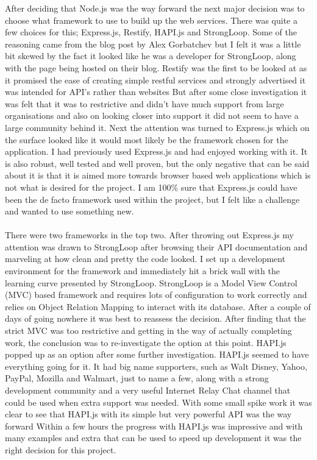 After deciding that Node.js was the way forward the next major decision was to choose what framework to use to build up the web services. There was quite a few choices for this; Express.js, Restify, HAPI.js and StrongLoop. Some of the reasoning came from the blog post by Alex Gorbatchev \cite{AlexGorbatchev:CompairingExpressRestifyHapLoopBack:2015:online} but I felt it was a little bit skewed by the fact it looked like he was a developer for StrongLoop, along with the page being hosted on their blog. Restify was the first to be looked at as it promised the ease of creating simple restful services and strongly advertised it was intended for API's rather than websites But after some close investigation it was felt that it was to restrictive and didn't have much support from large organisations and also on looking closer into support it did not seem to have a large community behind it. Next the attention was turned to Express.js which on the surface looked like it would most likely be the framework chosen for the application. I had previously used Express.js and had enjoyed working with it. It is also robust, well tested and well proven, but the only negative that can be said about it is that it is aimed more towards browser based web applications which is not what is desired for the project. I am 100\% sure that Express.js could have been the de facto framework used within the project, but I felt like a challenge and wanted to use something new.\\
\\
There were two frameworks in the top two. After throwing out Express.js my attention was drawn to StrongLoop after browsing their API documentation and marveling at how clean and pretty the code looked. I set up a development environment for the framework and immediately hit a brick wall with the learning curve presented by StrongLoop. StrongLoop is a Model View Control (MVC) based framework and requires lots of configuration to work correctly and relies on Object Relation Mapping to interact with its database. After a couple of days of going nowhere it was best to reassess the decision. After finding that the strict MVC was too restrictive and getting in the way of actually completing work, the conclusion was to re-investigate the option at this point. HAPI.js popped up as an option after some further investigation. HAPI.js seemed to have everything going for it. It had big name supporters, such as Walt Disney, Yahoo, PayPal, Mozilla and Walmart, just to name a few, along with a strong development community and a very useful Internet Relay Chat channel that could be used when extra support was needed. With some small spike work it was clear to see that HAPI.js with its simple but very powerful API was the way forward Within a few hours the progress with HAPI.js was impressive and with many examples and extra that can be used to speed up development it was the right decision for this project.

